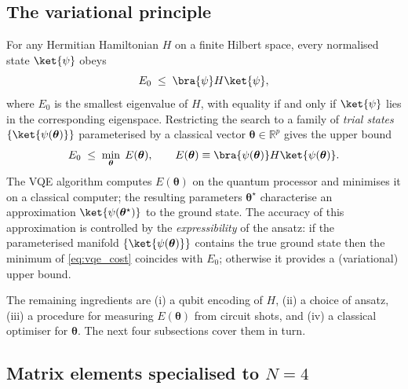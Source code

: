 \subsection{The variational principle}
\label{ssec:vqe_principle}

For any Hermitian Hamiltonian $H$ on a finite Hilbert space, every
normalised state $\ket{\psi}$ obeys
\begin{equation}
  \label{eq:rayleigh_ritz}
  E_0 \;\leq\; \bra{\psi}H\ket{\psi},
\end{equation}
where $E_0$ is the smallest eigenvalue of $H$, with equality if and only if
$\ket{\psi}$ lies in the corresponding eigenspace. Restricting the search to
a family of \emph{trial states} $\{\ket{\psi(\bm{\theta})}\}$ parameterised by a
classical vector $\bm{\theta}\in\mathbb{R}^{p}$ gives the upper bound
\begin{equation}
  \label{eq:vqe_cost}
  E_0 \;\leq\;
  \min_{\bm{\theta}} \;
  E(\bm{\theta}),
  \qquad
  E(\bm{\theta}) \equiv \bra{\psi(\bm{\theta})} H \ket{\psi(\bm{\theta})}.
\end{equation}
The VQE algorithm computes $E(\bm{\theta})$ on the quantum processor and
minimises it on a classical computer; the resulting parameters
$\bm{\theta}^{\star}$ characterise an approximation $\ket{\psi(\bm{\theta}^{\star})}$
to the ground state. The accuracy of this approximation is controlled by
the \emph{expressibility} of the ansatz: if the parameterised manifold
$\{\ket{\psi(\bm{\theta})}\}$ contains the true ground state then the
minimum of \cref{eq:vqe_cost} coincides with $E_0$; otherwise it provides
a (variational) upper bound.

The remaining ingredients are (i) a qubit encoding of $H$, (ii) a choice
of ansatz, (iii) a procedure for measuring $E(\bm{\theta})$ from circuit
shots, and (iv) a classical optimiser for $\bm{\theta}$. The next four
subsections cover them in turn.

\subsection{Matrix elements specialised to $N=4$}
\label{ssec:gallimore_matrix_elements}

